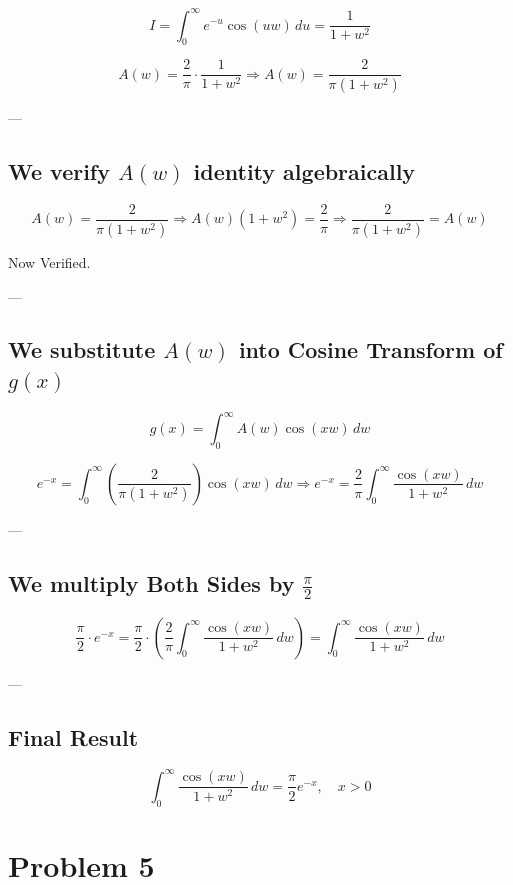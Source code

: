\documentclass{article}
\begin{document}
\[
I = \int_0^\infty e^{-u} \cos(uw) \, du = \frac{1}{1 + w^2}
\]

\[
A(w) = \frac{2}{\pi} \cdot \frac{1}{1 + w^2}
\Rightarrow
A(w) = \frac{2}{\pi(1 + w^2)}
\]

---

\subsection*{We verify \( A(w) \) identity algebraically}

\[
A(w) = \frac{2}{\pi(1 + w^2)} \Rightarrow A(w)(1 + w^2) = \frac{2}{\pi}
\Rightarrow \frac{2}{\pi(1 + w^2)} = A(w)
\]

Now Verified.

---

\subsection*{We substitute \( A(w) \) into Cosine Transform of \( g(x) \)}

\[
g(x) = \int_0^\infty A(w) \cos(xw) \, dw
\]

\[
e^{-x} = \int_0^\infty \left( \frac{2}{\pi(1 + w^2)} \right) \cos(xw) \, dw
\Rightarrow
e^{-x} = \frac{2}{\pi} \int_0^\infty \frac{\cos(xw)}{1 + w^2} \, dw
\]

---

\subsection*{We multiply Both Sides by \( \frac{\pi}{2} \)}

\[
\frac{\pi}{2} \cdot e^{-x}
= \frac{\pi}{2} \cdot \left( \frac{2}{\pi} \int_0^\infty \frac{\cos(xw)}{1 + w^2} \, dw \right)
= \int_0^\infty \frac{\cos(xw)}{1 + w^2} \, dw
\]

---

\subsection*{Final Result}

\[
\boxed{
\int_0^\infty \frac{\cos(xw)}{1 + w^2} \, dw = \frac{\pi}{2} e^{-x}, \quad x > 0
}
\]


\newpage
\section*{Problem 5}
\end{document}
